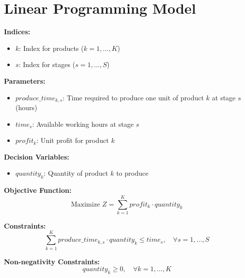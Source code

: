 \documentclass{article}
\begin{document}
\section*{Linear Programming Model}

\textbf{Indices:}
\begin{itemize}
    \item $k$: Index for products ($k = 1, \ldots, K$)
    \item $s$: Index for stages ($s = 1, \ldots, S$)
\end{itemize}

\textbf{Parameters:}
\begin{itemize}
    \item $produce\_time_{k, s}$: Time required to produce one unit of product $k$ at stage $s$ (hours)
    \item $time_{s}$: Available working hours at stage $s$
    \item $profit_{k}$: Unit profit for product $k$
\end{itemize}

\textbf{Decision Variables:}
\begin{itemize}
    \item $quantity_{k}$: Quantity of product $k$ to produce
\end{itemize}

\textbf{Objective Function:}
\begin{equation}
\text{Maximize } Z = \sum_{k=1}^{K} profit_{k} \cdot quantity_{k}
\end{equation}

\textbf{Constraints:}
\begin{equation}
\sum_{k=1}^{K} produce\_time_{k, s} \cdot quantity_{k} \leq time_{s}, \quad \forall s = 1, \ldots, S
\end{equation}

\textbf{Non-negativity Constraints:}
\begin{equation}
quantity_{k} \geq 0, \quad \forall k = 1, \ldots, K
\end{equation}
\end{document}
